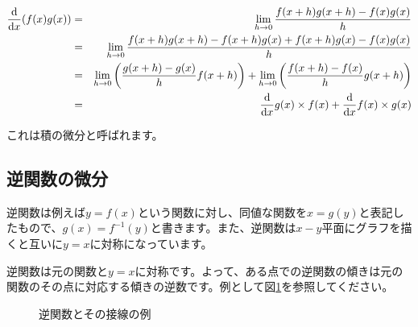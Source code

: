 \begin{eqnarray}
    \frac{\mathrm{d}}{\mathrm{d}x}(f(x)g(x)) &=& \lim_{h\to 0}\frac{f(x+h)g(x+h)-f(x)g(x)}{h} \notag \\
    &=& \lim_{h\to 0}\frac{f(x+h)g(x+h)-f(x+h)g(x)+f(x+h)g(x)-f(x)g(x)}{h} \notag \\
    &=& \lim_{h\to 0}\left(\frac{g(x+h)-g(x)}{h}f(x+h)\right)+\lim_{h\to 0}\left(\frac{f(x+h)-f(x)}{h}g(x+h)\right) \notag \\
    &=& \frac{\mathrm{d}}{\mathrm{d}x}g(x)\times f(x)+\frac{\mathrm{d}}{\mathrm{d}x}f(x)\times g(x)
\end{eqnarray}

これは積の微分と呼ばれます。



\subsection{逆関数の微分}
\label{differential-inverse}
逆関数は例えば$y=f(x)$という関数に対し、同値な関数を$x=g(y)$と表記したもので、$g(x)=f^{-1}(y)$と書きます。また、逆関数は$x-y$平面にグラフを描くと互いに$y=x$に対称になっています。

逆関数は元の関数と$y=x$に対称です。よって、ある点での逆関数の傾きは元の関数のその点に対応する傾きの逆数です。例として図\ref{fig:inverse}を参照してください。

\begin{figure}[htbp]
\begin{center}
\caption{逆関数とその接線の例}
\label{fig:inverse}
\end{center}
\end{figure}

